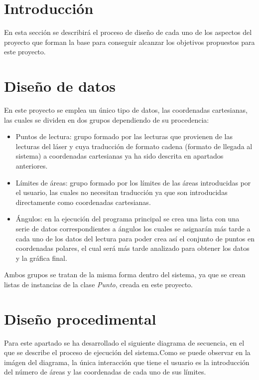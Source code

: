 
\section{Introducción}

En esta sección se describirá el proceso de diseño de cada uno de los aspectos del proyecto que forman la base para conseguir alcanzar los objetivos propuestos para este proyecto.\\

\section{Diseño de datos}

En este proyecto se emplea un único tipo de datos, las coordenadas cartesianas, las cuales se dividen en dos grupos dependiendo de su procedencia:
\begin{itemize}
	\item Puntos de lectura: grupo formado por las lecturas que provienen de las lecturas del láser y cuya traducción de formato cadena (formato de llegada al sistema) a coordenadas cartesianas ya ha sido descrita en apartados anteriores.
	\item Límites de áreas: grupo formado por los límites de las áreas introducidas por el usuario, las cuales no necesitan traducción ya que son introducidas directamente como coordenadas cartesianas.
	\item Ángulos: en la ejecución del programa principal se crea una lista con una serie de datos correspondientes a ángulos los cuales se asignarán más tarde a cada uno de los datos del lectura para poder crea así el conjunto de puntos en coordenadas polares, el cual será más tarde analizado para obtener los datos y la gráfica final.
\end{itemize}
Ambos grupos se tratan de la misma forma dentro del sistema, ya que se crean listas de instancias de la clase \textit{Punto}, creada en este proyecto.

\section{Diseño procedimental}

Para este apartado se ha desarrollado el siguiente diagrama de secuencia, en el que se describe el proceso de ejecución del sistema.Como se puede observar en la imágen del diagrama, la única interacción que tiene el usuario es la introducción del número de áreas y las coordenadas de cada uno de sus límites.

